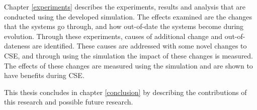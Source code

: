 Chapter \ref{experiments} describes the experiments, results and analysis that are conducted using the developed simulation.
The effects examined are the changes that the systems go through, and how out-of-date the systems become during evolution.
Through these experiments, causes of additional change and out-of-dateness are identified.
These causes are addressed with some novel changes to CSE, and through using the simulation the impact of these changes is measured.
The effects of these changes are measured using the simulation and are shown to have benefits during CSE.

This thesis concludes in chapter \ref{conclusion} by describing the contributions of this research and possible future research.
